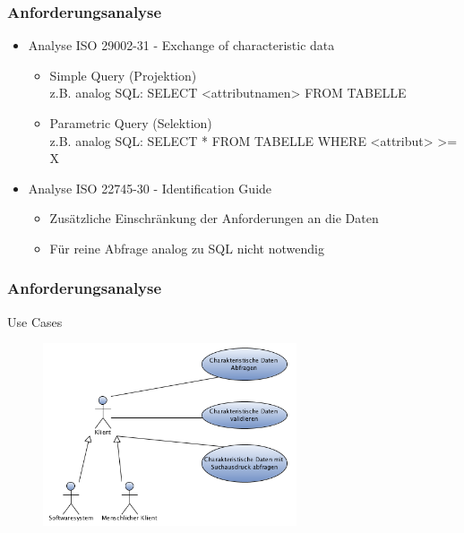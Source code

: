 \documentclass[serif,mathserif]{beamer}
\begin{document}
\begin{frame}
  \frametitle{Anforderungsanalyse}
  \begin{itemize}
  \item Analyse ISO 29002-31 - Exchange of characteristic data
    \begin{itemize}
    \item Simple Query (Projektion) \\ z.B. analog SQL: SELECT <attributnamen> FROM TABELLE
    \item Parametric Query (Selektion) \\ z.B. analog SQL: SELECT * FROM TABELLE WHERE <attribut> >= X
    \end{itemize}
  \item Analyse ISO 22745-30 - Identification Guide
    \begin{itemize}
    \item Zusätzliche Einschränkung der Anforderungen an die Daten
    \item Für reine Abfrage analog zu SQL nicht notwendig
    \end{itemize}  
  \end{itemize}
\end{frame}

\begin{frame}
  \frametitle{Anforderungsanalyse}
  Use Cases
    \begin{figure}[t]
    \includegraphics[width=7.5cm]{images/usecases_plib.png}
  \end{figure}
\end{frame}
\end{document}
